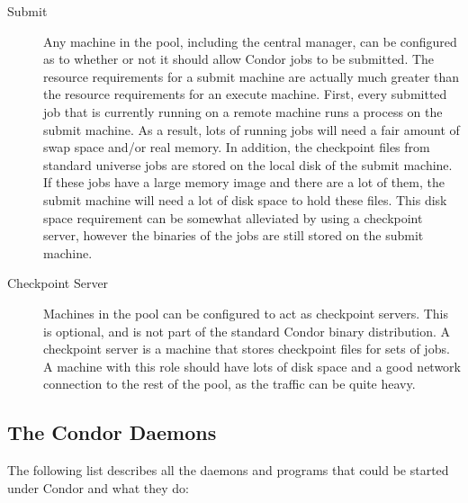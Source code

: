 \begin{description}
\item[Submit] Any machine in the pool,
including the central manager,
can be configured as to whether or not it should allow Condor
jobs to be submitted.
The resource requirements for a submit machine
are actually much greater than the resource requirements for an
execute machine.  First, every submitted job that is
currently running on a remote machine runs a process on
the submit machine.  
As a result, lots of running jobs
will need a fair amount of swap space and/or real memory.
In addition,
the checkpoint files from standard universe jobs are stored on 
the local disk of the submit machine.
If these jobs have a large
memory image and there are a lot of them, 
the submit machine will need a lot of disk space to hold these files.
This disk space requirement can be
somewhat alleviated by using a checkpoint server,
however the binaries of the jobs are still stored on the submit machine.

\item[Checkpoint Server]  Machines in the pool can be configured to act as
checkpoint servers.
This is optional, and is not part of the
standard Condor binary distribution.  A checkpoint server is a
machine that stores checkpoint files for sets of jobs.
A machine with this role should have lots of disk space
and a good network connection to the rest of the pool, as the traffic
can be quite heavy.

\end{description}

\subsection{\label{sec:Condor-Daemons}The Condor Daemons}

The following list describes all the daemons and programs that could
be started under Condor and what they do:

